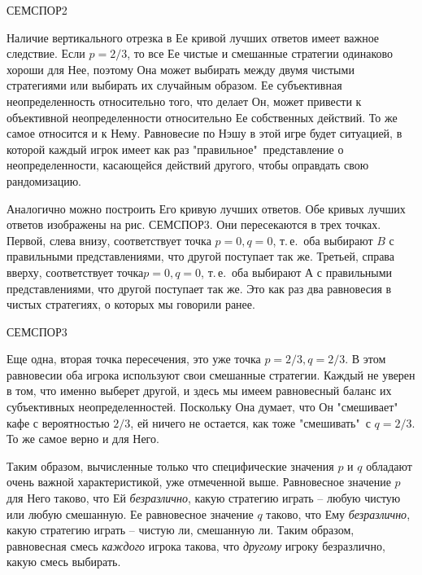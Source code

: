{СЕМСПОР2

Наличие вертикального отрезка  в Ее кривой лучших ответов имеет важное следствие. Если
$p=2/3$, то все Ее чистые и смешанные стратегии одинаково хороши для Нее, поэтому Она
может выбирать между двумя чистыми стратегиями или выбирать их случайным образом.
Ее субъективная неопределенность относительно того, что делает Он, может привести к
объективной неопределенности относительно Ее собственных действий. То же самое относится и к Нему.
Равновесие по Нэшу в этой игре будет ситуацией, в которой каждый игрок имеет как раз
"правильное"\, представление о неопределенности, касающейся действий другого, чтобы
оправдать свою рандомизацию.

Аналогично можно построить Его кривую лучших ответов. Обе кривых лучших ответов изображены
на рис. СЕМСПОР3. Они пересекаются в трех точках. Первой, слева внизу, соответствует точка
$p=0, q=0$, т.\,е.\, оба выбирают $B$ с правильными представлениями, что другой поступает так же.
Третьей, справа вверху, соответствует точка$p=0, q=0$, т.\,е.\, оба выбирают $А$ с
правильными представлениями, что другой поступает так же. Это как раз два равновесия в
чистых стратегиях, о которых мы говорили ранее.

СЕМСПОР3

Еще одна, вторая точка пересечения, это уже точка $p=2/3, q=2/3$. В этом равновесии оба игрока
используют свои смешанные стратегии. Каждый не уверен в том, что именно выберет другой, и здесь
мы имеем равновесный баланс их субъективных неопределенностей. Поскольку Она думает, что Он
"смешивает"\, кафе с вероятностью $2/3$, ей ничего не остается, как тоже "смешивать"\, с
$q=2/3$. То же самое верно и для Него.


Таким образом, вычисленные только что специфические значения $p$ и $q$
обладают очень важной характеристикой, уже отмеченной выше.
Равновесное значение $p$ для Него таково,
что Ей \emph{безразлично}, какую стратегию играть -- любую чистую или любую
смешанную. Ее равновесное значение $q$ таково, что Ему \emph{безразлично},
какую стратегию играть -- чистую ли, смешанную ли. Таким образом,
равновесная смесь \emph{каждого} игрока такова, что \emph{другому}
игроку безразлично, какую смесь выбирать.

}
